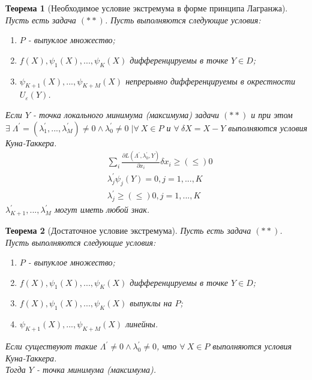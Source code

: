 \documentclass[12pt]{article}
\newtheorem{theorem}{Теорема}[section]
\theoremstyle{definition}
\theoremstyle{remark}
\begin{document}
\begin{theorem}[Необходимое условие экстремума в форме принципа Лагранжа]
  Пусть есть задача $(**)$. Пусть выполняются следующие условия:
  \begin{enumerate}
    \item $P$ - выпуклое множество;
    \item $f(X),\psi_1(X),...,\psi_K(X)$ дифференцируемы в точке $Y\in D$;
    \item $\psi_{K+1}(X),...,\psi_{K+M}(X)$ непрерывно дифференцируемы в окрестности $U_{\varepsilon}(Y)$.
  \end{enumerate}
Если $Y$ - точка локального минимума (максимума) задачи $(**)$ и при этом $\exists\;\Lambda^{'}=(\lambda_1^{'},...,\lambda_M^{'})\neq 0
\land \lambda_0^{'}\neq 0 \;\big|\forall\:X\in P$ и $\forall\: \delta X=X-Y$ выполняются условия Куна-Таккера.
\begin{align}
  &\sum_i \frac{\partial L(\Lambda^{'},\lambda_0^{'},Y)}{\partial x_i}\delta x_i \geqslant (\leqslant) 0\\
  &\lambda_j^{'}\psi_j(Y)=0, j=1,...,K\\
  &\lambda_j^{'}\geqslant (\leqslant) 0, j=1,...,K
\end{align}
$\lambda_{K+1}^{'},...,\lambda_M^{'}$ могут иметь любой знак.
\end{theorem}

\begin{theorem}[Достаточное условие экстремума]
  Пусть есть задача $(**)$. Пусть выполняются следующие условия:
  \begin{enumerate}
    \item $P$ - выпуклое множество;
    \item $f(X),\psi_1(X),...,\psi_K(X)$ дифференцируемы в точке $Y\in D$;
    \item $f(X),\psi_1(X),...,\psi_K(X)$ выпуклы на $P$;
    \item $\psi_{K+1}(X),...,\psi_{K+M}(X)$ линейны.
  \end{enumerate}
  Если существуют такие $\Lambda^{'}\neq 0 \land \lambda_0^{'}\neq 0$, что $\forall\:X\in P $ выполняются условия Куна-Таккера.\\
  Тогда $Y$ - точка минимума (максимума).
\end{theorem}
\end{document}
